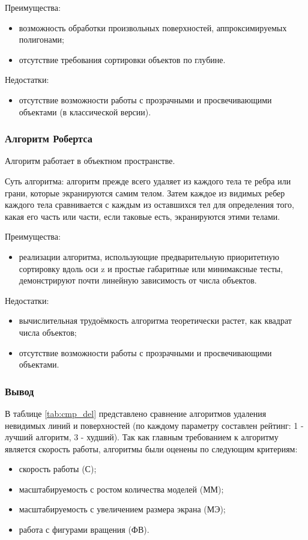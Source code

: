 Преимущества:
\begin{itemize}
    \item возможность обработки произвольных поверхностей, аппроксимируемых полигонами;
    \item отсутствие требования сортировки объектов по глубине.
\end{itemize}

Недостатки:
\begin{itemize}
    \item отсутствие возможности работы с прозрачными и просвечивающими объектами (в классической версии).
\end{itemize}

\subsubsection{Алгоритм Робертса}
Алгоритм работает в объектном пространстве\cite{robert}.

Суть алгоритма: алгоритм прежде всего удаляет из каждого тела те ребра или грани, которые экранируются самим телом. Затем каждое из видимых ребер каждого тела сравнивается с каждым из оставшихся тел для определения того, какая его часть или части, если таковые есть, экранируются этими телами.

Преимущества:
\begin{itemize}
    \item реализации алгоритма, использующие предварительную приоритетную сортировку вдоль оси z и простые габаритные или минимаксные тесты, демонстрируют почти линейную зависимость от числа объектов\cite{robert}.
\end{itemize}

Недостатки:
\begin{itemize}
    \item вычислительная трудоёмкость алгоритма теоретически растет, как квадрат числа объектов\cite{robert};
    \item отсутствие возможности работы с прозрачными и просвечивающими объектами.
\end{itemize}

\subsubsection*{Вывод}

В таблице \ref{tab:cmp_del} представлено сравнение алгоритмов\cite{rogers} удаления невидимых линий и поверхностей (по каждому параметру составлен рейтинг: 1 - лучший алгоритм, 3 - худший). Так как главным требованием к алгоритму является скорость работы, алгоритмы были оценены по следующим критериям:
\begin{itemize}
    \item скорость работы (С);
    \item масштабируемость с ростом количества моделей (ММ);
    \item масштабируемость с увеличением размера экрана (МЭ);
    \item работа с фигурами вращения (ФВ).
\end{itemize}

